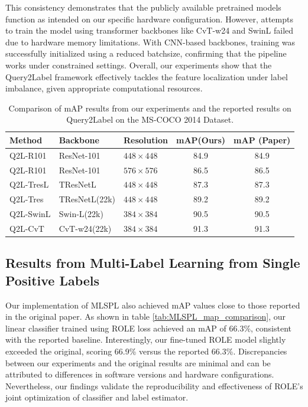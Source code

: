 \documentclass[lettersize,journal]{IEEEtran}
\begin{document}
This consistency demonstrates that the publicly available pretrained models function as intended on our specific hardware configuration. However, attempts to train the model using transformer backbones like CvT-w24 and SwinL failed due to hardware memory limitations. With CNN-based backbones, training was successfully initialized using a reduced batchsize, confirming that the pipeline works under constrained settings. Overall, our experiments show that the Query2Label framework effectively tackles the feature localization under label imbalance, given appropriate computational resources.

\begin{table}[t]
    \small
    \caption{Comparison of mAP results from our experiments and the reported results on Query2Label on the MS-COCO 2014 Dataset.}
    \label{tab:q2l_map_comparison}
    \centering
    \begin{tabular}{l l l c c}
    \toprule
    \textbf{Method} & \textbf{Backbone} & \textbf{Resolution} & \textbf{mAP(Ours)} & \textbf{mAP (Paper)} \\
    \midrule
    Q2L-R101     & ResNet-101     & $448\times448$ & 84.9 & 84.9 \\
    Q2L-R101     & ResNet-101     & $576\times576$ & 86.5 & 86.5 \\
    Q2L-TresL    & TResNetL       & $448\times448$ & 87.3 & 87.3 \\
    Q2L-Tres     & TResNetL(22k)  & $448\times448$ & 89.2 & 89.2 \\
    Q2L-SwinL    & Swin-L(22k)    & $384\times384$ & 90.5 & 90.5 \\
    Q2L-CvT      & CvT-w24(22k)   & $384\times384$ & 91.3 & 91.3 \\
    \bottomrule
    \end{tabular}
\end{table}

\subsection{Results from Multi-Label Learning from Single Positive Labels}
Our implementation of MLSPL also achieved mAP values close to those reported in the original paper. As shown in table \ref{tab:MLSPL_map_comparison}, our linear classifier trained using ROLE loss achieved an mAP of 66.3\%, consistent with the reported baseline. Interestingly, our fine-tuned ROLE model slightly exceeded the original, scoring 66.9\% versus the reported 66.3\%. Discrepancies between our experiments and the original results are minimal and can be attributed to differences in software versions and hardware configurations. Nevertheless, our findings validate the reproducibility and effectiveness of ROLE's joint optimization of classifier and label estimator.
\end{document}

